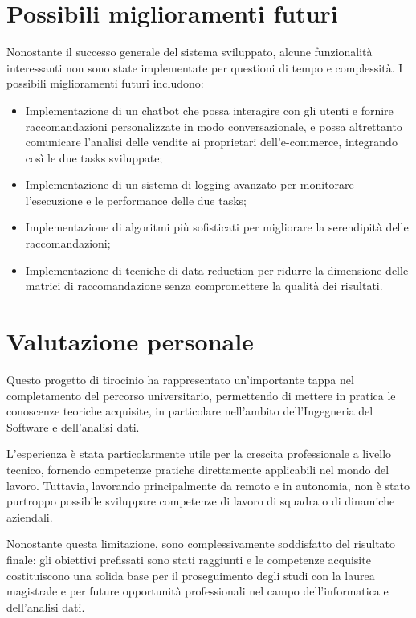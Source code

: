 \section{Possibili miglioramenti futuri}

Nonostante il successo generale del sistema sviluppato, alcune funzionalità interessanti non sono state implementate per questioni di tempo e complessità. I possibili miglioramenti futuri includono:

\begin{itemize}
    \item Implementazione di un chatbot che possa interagire con gli utenti e fornire raccomandazioni personalizzate in modo conversazionale, e possa altrettanto comunicare l'analisi delle vendite ai proprietari dell'e-commerce, integrando così le due tasks sviluppate;
    \item Implementazione di un sistema di logging avanzato per monitorare l'esecuzione e le performance delle due tasks;
    \item Implementazione di algoritmi più sofisticati per migliorare la serendipità delle raccomandazioni;
    \item Implementazione di tecniche di \gls{data-reduction} per ridurre la dimensione delle matrici di raccomandazione senza compromettere la qualità dei risultati.
\end{itemize}

\section{Valutazione personale}

Questo progetto di tirocinio ha rappresentato un'importante tappa nel completamento del percorso universitario, permettendo di mettere in pratica le conoscenze teoriche acquisite, in particolare nell'ambito dell'Ingegneria del Software e dell'analisi dati.

L'esperienza è stata particolarmente utile per la crescita professionale a livello tecnico, fornendo competenze pratiche direttamente applicabili nel mondo del lavoro. Tuttavia, lavorando principalmente da remoto e in autonomia, non è stato purtroppo possibile sviluppare competenze di lavoro di squadra o di dinamiche aziendali.

Nonostante questa limitazione, sono complessivamente soddisfatto del risultato finale: gli obiettivi prefissati sono stati raggiunti e le competenze acquisite costituiscono una solida base per il proseguimento degli studi con la laurea magistrale e per future opportunità professionali nel campo dell'informatica e dell'analisi dati.
